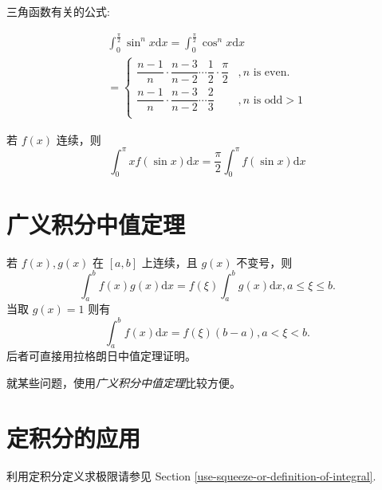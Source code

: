 \documentclass{beaulivre}
\begin{document}
三角函数有关的公式:
\begin{lemma}
    \begin{multline}
        \int_0^{\frac{\pi}{2}} \sin ^n x \mathrm{d} x = \int_0^{\frac{\pi}{2}} \cos ^n x \mathrm{d} x \\
        = 
        \left\{ 
            \begin{array}{rl}
                \dfrac{n - 1}{n} \cdot \dfrac{n - 3}{n - 2} \cdots \dfrac{1}{2} \cdot \dfrac{\pi}{2} &, n \mbox{\ is even.}   \\[1em]
                \dfrac{n - 1}{n} \cdot \dfrac{n - 3}{n - 2} \cdots \dfrac{2}{3}                      &, n \mbox{\ is odd} > 1 \\
            \end{array}
        \right.
    \end{multline}
    
    若 $f(x)$ 连续，则
    \begin{equation}
        \int_0^{\pi} x f(\sin x) \mathrm{d} x = \dfrac{\pi}{2} \int_0^{\pi} f(\sin x) \mathrm{d} x
    \end{equation}
\end{lemma}

\section{广义积分中值定理} 

\begin{theorem}[广义积分中值定理] \label{general-mean-value-theorem-of-integral}
    若 $f(x), g(x)$ 在 $[a, b]$ 上连续，且 $g(x)$ 不变号，则
    \[
        \int_a^b f(x) g(x) \mathrm{d} x = f(\xi) \int_a^b g(x) \mathrm{d} x, a \leq \xi \leq b.
    \]
    当取 $g(x) = 1$ 则有
    \[
        \int_a^b f(x) \mathrm{d} x = f(\xi)(b - a), a < \xi < b.
    \]
    后者可直接用拉格朗日中值定理证明。
\end{theorem}
就某些问题，使用\emph{广义积分中值定理}比较方便。

\section{定积分的应用}\label{app-finite-integral}

利用定积分定义求极限请参见 Section \ref{use-squeeze-or-definition-of-integral}.

\cleardoublepage

\end{document}
